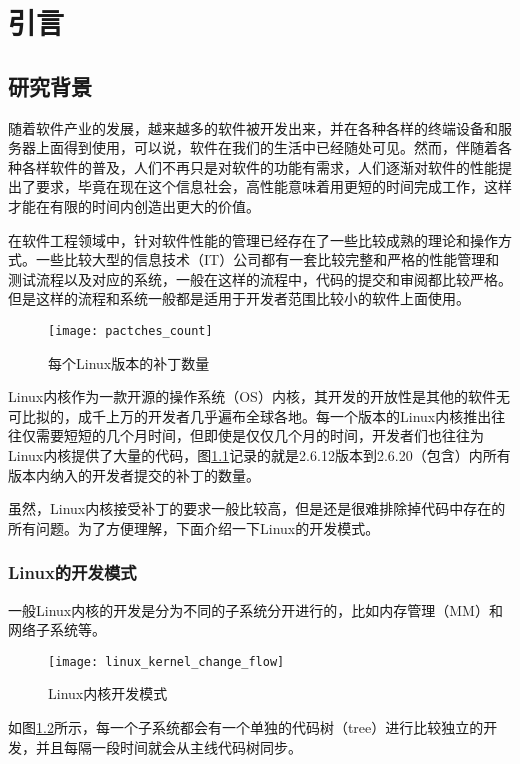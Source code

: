 
\chapter{引言}


\section{研究背景}

随着软件产业的发展，越来越多的软件被开发出来，并在各种各样的终端设备和服务器上面得到使用，可以说，软件在我们的生活中已经随处可见。然而，伴随着各种各样软件的普及，人们不再只是对软件的功能有需求，人们逐渐对软件的性能提出了要求，毕竟在现在这个信息社会，高性能意味着用更短的时间完成工作，这样才能在有限的时间内创造出更大的价值。

在软件工程领域中，针对软件性能的管理已经存在了一些比较成熟的理论和操作方式。一些比较大型的信息技术（IT）公司都有一套比较完整和严格的性能管理和测试流程以及对应的系统，一般在这样的流程中，代码的提交和审阅都比较严格。但是这样的流程和系统一般都是适用于开发者范围比较小的软件上面使用。

\begin{figure}[H]
\centering
\texttt{[image: pactches\_count]}
\caption{每个Linux版本的补丁数量}
\label{fig:patches_count}
\end{figure}

Linux内核作为一款开源的操作系统（OS）内核，其开发的开放性是其他的软件无可比拟的，成千上万的开发者几乎遍布全球各地。每一个版本的Linux内核推出往往仅需要短短的几个月时间，但即使是仅仅几个月的时间，开发者们也往往为Linux内核提供了大量的代码，图\ref{fig:patches_count}\cite{chen2007keeping}记录的就是2.6.12版本到2.6.20（包含）内所有版本内纳入的开发者提交的补丁的数量。

虽然，Linux内核接受补丁的要求一般比较高，但是还是很难排除掉代码中存在的所有问题。为了方便理解，下面介绍一下Linux的开发模式。


\subsection{Linux的开发模式}

一般Linux内核的开发是分为不同的子系统分开进行的，比如内存管理（MM）和网络子系统等。
\begin{figure}[H]
\centering
\texttt{[image: linux\_kernel\_change\_flow]}
\caption{Linux内核开发模式}
\label{fig:linux_kernel_change_flow}
\end{figure}

如图\ref{fig:linux_kernel_change_flow}所示，每一个子系统都会有一个单独的代码树（tree）进行比较独立的开发，并且每隔一段时间就会从主线代码树同步。

